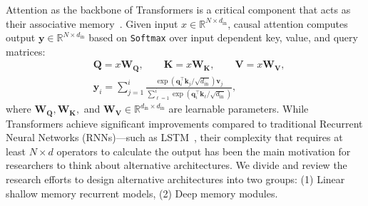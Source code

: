 \documentclass{article}
\newcommand{\citep}{\parencite}
\newcommand{\R}[0]{\mathbb{R}}
\theoremstyle{plain}
\theoremstyle{definition}
\theoremstyle{remark}
\newcommand{\head}[1]{\vspace{1.7mm}\noindent{{\textcolor{c2}{\bf #1.}}}}
\begin{document}
\head{Attention}
Attention as the backbone of Transformers is a critical component that acts as their associative memory~\citep{bietti2023birth}. Given input $x \in \R^{N \times d_{\text{in}}}$, causal attention computes output $\mathbf{y} \in \R^{N \times d_{\text{in}}}$ based on \texttt{Softmax} over input dependent key, value, and query matrices:
\begin{align}
    &\mathbf{Q} = x \mathbf{W}_{\mathbf{Q}}, \qquad \mathbf{K} = x \mathbf{W}_{\mathbf{K}}, \qquad \mathbf{V} = x \mathbf{W}_{\mathbf{V}}, \\
    &\mathbf{y}_i = \sum_{j = 1}^{i} \frac{ \exp\left( \mathbf{q}_i^{\top} \mathbf{k}_j/\sqrt{d_{\text{in}}}\right) \mathbf{v}_j }{\sum_{\ell = 1}^{i} \exp\left( \mathbf{q}_i^{\top} \mathbf{k}_{\ell}/\sqrt{d_{\text{in}}}\right)},
\end{align}
where $\mathbf{W}_{\mathbf{Q}}, \mathbf{W}_{\mathbf{K}},$ and $\mathbf{W}_{\mathbf{V}} \in \R^{d_{\text{in}} \times d_{\text{in}}}$ are learnable parameters. While Transformers achieve significant improvements compared to traditional Recurrent Neural Networks (RNNs)—such as LSTM~\citep{LSTM}, their complexity that requires at least $N\times d$ operators to calculate the output has been the main motivation for researchers to think about alternative architectures. We divide and review the research efforts to design alternative architectures into two groups: (1) Linear shallow memory recurrent models, (2) Deep memory modules.
\end{document}

